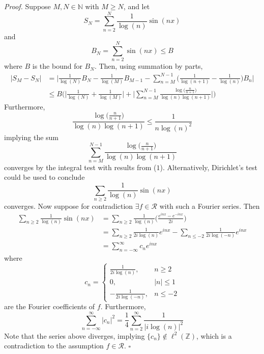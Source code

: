 \documentclass[12pt]{article}
\newenvironment{proof}{\textit{Proof.}}{\hfill$\square$}
\newcommand{\bbn}{\mathbb{N}}
\newcommand{\bbz}{\mathbb{Z}}
\newcommand{\calr}{\mathcal{R}}
\begin{document}
\vspace{2em}
\begin{proof}
    Suppose $M,N\in\bbn$ with $M\ge N$, and let
    \begin{equation*}
        S_N = \sum_{n=2}^{N}\frac{1}{\log(n)}\sin(nx)
    \end{equation*}
    and
    \begin{equation*}
        B_N = \sum_{n=2}^{N}\sin(nx) \le B
    \end{equation*}
    where $B$ is the bound for $B_N$. Then, using summation by parts,
    \begin{align*}
        |S_M-S_N| &= \Big|\frac{1}{\log(N)}B_N - \frac{1}{\log(M)}B_{M-1}-\sum_{n=M}^{N-1}\Big(\frac{1}{\log(n+1)}-\frac{1}{\log(n)}\Big)B_n\Big| \\
        &\le B\Big(\Big|\frac{1}{\log(N)} + \frac{1}{\log(M)}\Big| + \Big|\sum_{n=M}^{N-1}\frac{\log\Big(\frac{n}{n+1}\Big)}{\log(n)\log(n+1)}\Big|\Big)
    \end{align*}
    Furthermore,
    \begin{equation}
        \frac{\log\Big(\frac{n}{n+1}\Big)}{\log(n)\log(n+1)} \le \frac{1}{n\log(n)^2}
    \end{equation}
    implying the sum
    \begin{equation*}
        \sum_{n=M}^{N-1}\frac{\log\Big(\frac{n}{n+1}\Big)}{\log(n)\log(n+1)}
    \end{equation*}
    converges by the integral test with results from ($1$). Alternatively, Dirichlet's test could be used to conclude
    \begin{equation*}
        \sum_{n\ge2}\frac{1}{\log(n)}\sin(nx)
    \end{equation*}
    converges.\newpage
    Now suppose for contradiction $\exists f\in\calr$ with such a Fourier series. Then 
    \begin{align*}
        \sum_{n\ge2}\frac{1}{\log(n)}\sin(nx) &= \sum_{n\ge2}\frac{1}{\log(n)}\Big(\frac{e^{inx}-e^{-inx}}{2i}\Big) \\
        &= \sum_{n\ge2}\frac{1}{2i\log(n)}e^{inx}-\sum_{n\le-2}\frac{1}{2i\log(-n)}e^{inx} \\
        &= \sum_{n=-\infty}^{\infty}c_ne^{inx}
    \end{align*}
    where
    \begin{equation*}
        c_n=\begin{cases}
            \frac{1}{2i\log(n)}, &n\ge2 \\
            0, &|n|\le1 \\
            -\frac{1}{2i\log(-n)}, &n\le-2
        \end{cases}
    \end{equation*}
    are the Fourier coefficients of $f$. Furthermore, 
    \begin{equation*}
        \sum_{n=-\infty}^{\infty}|c_n|^2 = \frac{1}{4}\sum_{n=2}^{\infty}\frac{1}{|i\log(n)|^2} 
    \end{equation*}
    Note that the series above diverges, implying $\{c_n\}\notin \ell^2(\bbz)$, which is a contradiction to the assumption $f\in\calr$.
\end{proof}
\end{document}
